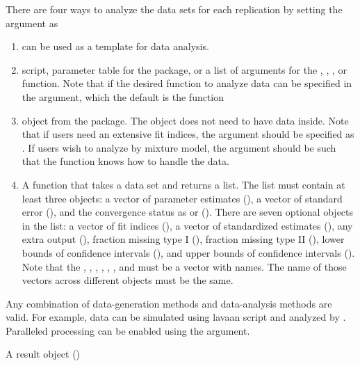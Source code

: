 \documentclass[a4paper]{book}
\begin{document}
\begin{Details}
There are four ways to analyze the data sets for each replication by setting the  argument as
\begin{enumerate}

\item {} can be used as a template for data analysis. 
\item {} script, parameter table for the  package, or a list of arguments for the , , , or  function. Note that if the desired function to analyze data can be specified in the  argument, which the default is the  function
\item {} object from the  package. The object does not need to have data inside. Note that if users need an extensive fit indices, the  argument should be specified as . If users wish to analyze by mixture model, the  argument should be  such that the  function knows how to handle the data.
\item A function that takes a data set and returns a list. The list must contain at least three objects: a vector of parameter estimates (), a vector of standard error (), and the convergence status as  or  (). There are seven optional objects in the list: a vector of fit indices (), a vector of standardized estimates (), any extra output (), fraction missing type I (), fraction missing type II (), lower bounds of confidence intervals (), and upper bounds of confidence intervals (). Note that the , , , , , , and  must be a vector with names. The name of those vectors across different objects must be the same.

\end{enumerate}


Any combination of data-generation methods and data-analysis methods are valid. For example, data can be simulated using lavaan script and analyzed by .  Paralleled processing can be enabled using the  argument. 
\end{Details}
%
\begin{Value}
A result object ()
\end{Value}
\end{document}
